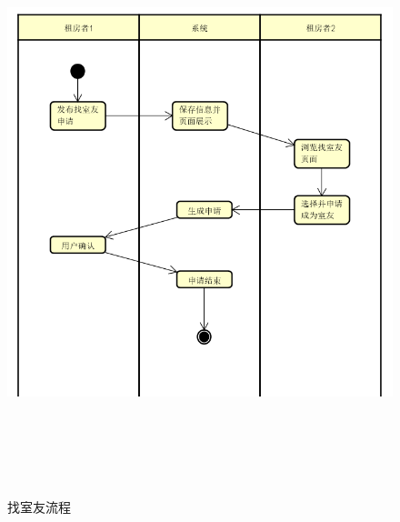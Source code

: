 \begin{figure}[htbp]

    \centering
    
    \includegraphics[height=17.0cm,width=14.0cm]{requirement/figures/zhaoshiyou.png} 
    
    \caption{找室友流程}
    
    \end{figure}
    \newpage